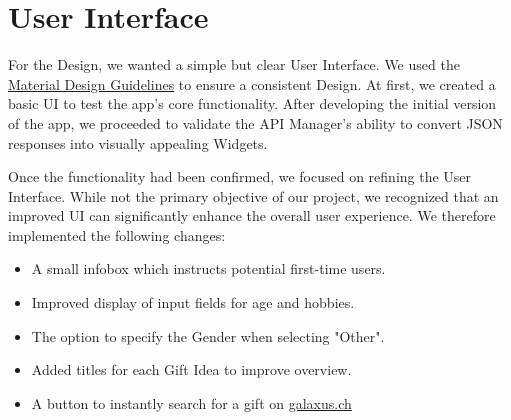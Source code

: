 \section*{User Interface}

For the Design, we wanted a simple but clear User Interface. We used the \href{https://m3.material.io/}{Material Design Guidelines} to ensure a consistent Design. At first, we created a basic UI to test the app's core functionality. After developing the initial version of the app, we proceeded to validate the API Manager's ability to convert JSON responses into visually appealing Widgets.

Once the functionality had been confirmed, we focused on refining the User Interface. While not the primary objective of our project, we recognized that an improved UI can significantly enhance the overall user experience. We therefore implemented the following changes:

\begin{itemize}
	\item A small infobox which instructs potential first-time users.
	\item Improved display of input fields for age and hobbies.
	\item The option to specify the Gender when selecting "Other".
	\item Added titles for each Gift Idea to improve overview.
	\item A button to instantly search for a gift on \url{galaxus.ch}
\end{itemize}

